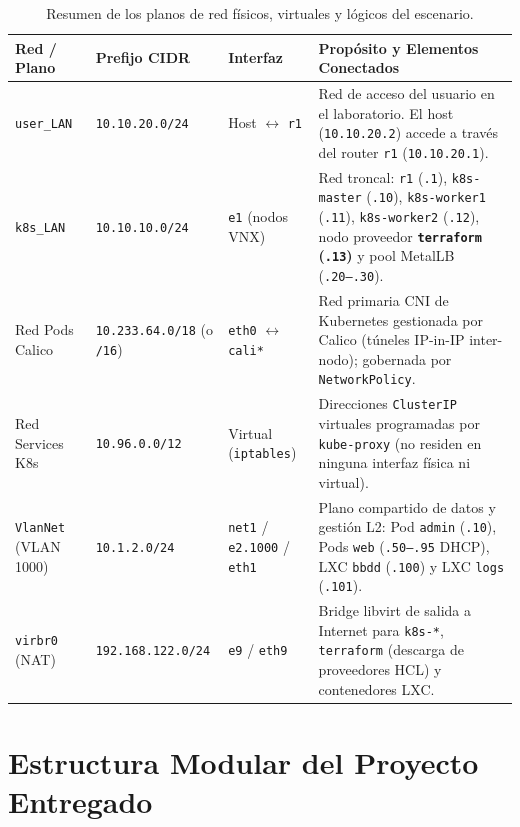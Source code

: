 \begin{table}[H]
\centering
\small
\renewcommand{\arraystretch}{1.25}
\begin{tabularx}{\textwidth}{l l l X}
\toprule
\textbf{Red / Plano} & \textbf{Prefijo CIDR} & \textbf{Interfaz} & \textbf{Propósito y Elementos Conectados} \\
\midrule
\texttt{user\_LAN} & \texttt{10.10.20.0/24} & Host $\leftrightarrow$ \texttt{r1} & Red de acceso del usuario en el laboratorio. El host (\texttt{10.10.20.2}) accede a través del router \texttt{r1} (\texttt{10.10.20.1}). \\
\texttt{k8s\_LAN} & \texttt{10.10.10.0/24} & \texttt{e1} (nodos VNX) & Red troncal: \texttt{r1} (\texttt{.1}), \texttt{k8s-master} (\texttt{.10}), \texttt{k8s-worker1} (\texttt{.11}), \texttt{k8s-worker2} (\texttt{.12}), nodo proveedor \textbf{\texttt{terraform} (\texttt{.13})} y pool MetalLB (\texttt{.20--.30}). \\
Red Pods Calico & \texttt{10.233.64.0/18} (o \texttt{/16}) & \texttt{eth0} $\leftrightarrow$ \texttt{cali*} & Red primaria CNI de Kubernetes gestionada por Calico (túneles IP-in-IP inter-nodo); gobernada por \texttt{NetworkPolicy}. \\
Red Services K8s & \texttt{10.96.0.0/12} & Virtual (\texttt{iptables}) & Direcciones \texttt{ClusterIP} virtuales programadas por \texttt{kube-proxy} (no residen en ninguna interfaz física ni virtual). \\
\texttt{VlanNet} (VLAN 1000) & \texttt{10.1.2.0/24} & \texttt{net1} / \texttt{e2.1000} / \texttt{eth1} & Plano compartido de datos y gestión L2: Pod \texttt{admin} (\texttt{.10}), Pods \texttt{web} (\texttt{.50--.95} DHCP), LXC \texttt{bbdd} (\texttt{.100}) y LXC \texttt{logs} (\texttt{.101}). \\
\texttt{virbr0} (NAT) & \texttt{192.168.122.0/24} & \texttt{e9} / \texttt{eth9} & Bridge libvirt de salida a Internet para \texttt{k8s-*}, \texttt{terraform} (descarga de proveedores HCL) y contenedores LXC. \\
\bottomrule
\end{tabularx}
\caption{Resumen de los planos de red físicos, virtuales y lógicos del escenario.}
\label{tab:planos-red}
\end{table}

\section{Estructura Modular del Proyecto Entregado}

